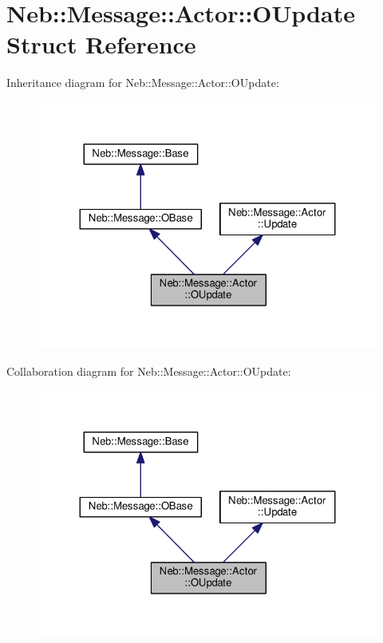 \hypertarget{structNeb_1_1Message_1_1Actor_1_1OUpdate}{\section{Neb\-:\-:Message\-:\-:Actor\-:\-:O\-Update Struct Reference}
\label{structNeb_1_1Message_1_1Actor_1_1OUpdate}
}


Inheritance diagram for Neb\-:\-:Message\-:\-:Actor\-:\-:O\-Update\-:
\nopagebreak
\begin{figure}[H]
\begin{center}
\leavevmode
\includegraphics[width=324pt]{structNeb_1_1Message_1_1Actor_1_1OUpdate__inherit__graph}
\end{center}
\end{figure}


Collaboration diagram for Neb\-:\-:Message\-:\-:Actor\-:\-:O\-Update\-:
\nopagebreak
\begin{figure}[H]
\begin{center}
\leavevmode
\includegraphics[width=324pt]{structNeb_1_1Message_1_1Actor_1_1OUpdate__coll__graph}
\end{center}
\end{figure}
